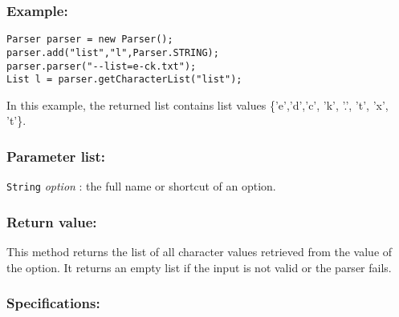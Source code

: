 \documentclass{article}
\begin{document}
\subsubsection*{Example:}

\begin{lstlisting}
Parser parser = new Parser();
parser.add("list","l",Parser.STRING);
parser.parser("--list=e-ck.txt");
List l = parser.getCharacterList("list");
\end{lstlisting}

In this example, the returned list contains list values \{'e','d','c', 'k', '.', 't', 'x', 't'\}.

\subsubsection*{Parameter list:}

\lstinline{String} \textsl{option} : the full name or shortcut of an option.  

\subsubsection*{Return value:} 

This method returns the list of all character values retrieved from
the value of the option. It returns an empty list if the input is not
valid or the parser fails.

\subsubsection*{Specifications:}
\end{document}
